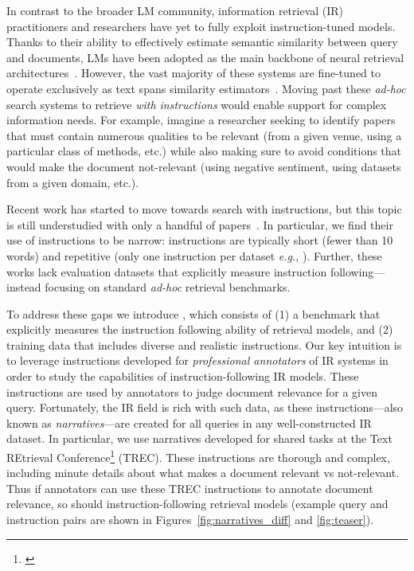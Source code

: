 \documentclass{article} %
\begin{document}
In contrast to the broader LM community, information retrieval (IR) practitioners and researchers have yet to fully exploit instruction-tuned models.
Thanks to their ability to effectively estimate semantic similarity between query and documents, LMs have been adopted as the main backbone of neural retrieval architectures~\citep{karpukhin2020dense,khattab2020colbert,reimers2019sentence}.
However, the vast majority of these systems are fine-tuned to operate exclusively as text spans similarity estimators~\citep{khattab2020colbert,izacard2021unsupervised,nogueira2019passage,pradeep2023rankzephyr,ma2023fine}.
Moving past these \textit{ad-hoc} search systems to retrieve \textit{with instructions} would enable support for complex information needs.
For example, imagine a researcher seeking to identify papers that must contain numerous qualities to be relevant (from a given venue, using a particular class of methods, etc.) while also making sure to avoid conditions that would make the document not-relevant (using negative sentiment, using datasets from a given domain, etc.).






Recent work has started to move towards search with instructions, but this topic is still understudied with only a handful of papers~\citep{INSTRUCTOR,asai2022tart,muennighoff2024generative}. 
In particular, we find their use of instructions to be narrow:
instructions are typically short (fewer than 10 words) and repetitive (only one instruction per dataset \textit{e.g.}, \citet{INSTRUCTOR,asai2022tart,li2023angle,bge_embedding}).
Further, these works lack evaluation datasets that explicitly measure instruction following---instead focusing on standard \textit{ad-hoc} retrieval benchmarks. 

To address these gaps we introduce \dataset, which consists of (1) a benchmark that explicitly measures the instruction following ability of retrieval models, and (2) training data that includes diverse and realistic instructions. 
Our key intuition is to leverage instructions developed for \textit{professional annotators} of IR systems in order to study the capabilities of instruction-following IR models.
These instructions are used by annotators to judge document relevance for a given query.
Fortunately, the IR field is rich with such data, as these instructions---also known as \textit{narratives}---are created for all queries in any well-constructed IR dataset.
In particular, we use narratives developed for shared tasks at the Text REtrieval Conference\footnote{\href{http://trec.nist.gov}{}} (TREC).
These instructions are thorough and complex, including minute details about what makes a document relevant vs not-relevant.  
Thus if annotators can use these TREC instructions to annotate document relevance, so should instruction-following retrieval models (example query and instruction pairs are shown in Figures~\ref{fig:narratives_diff} and \ref{fig:teaser}).
\end{document}
